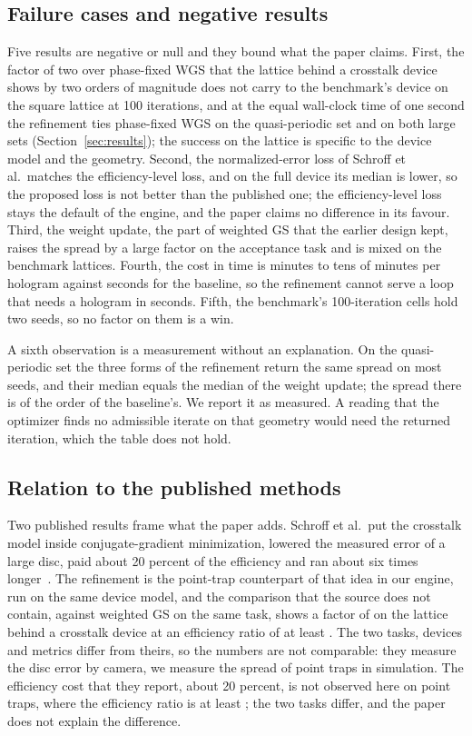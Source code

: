 \subsection{Failure cases and negative results}

Five results are negative or null and they bound what the paper claims. First, the factor of two over phase-fixed WGS that the lattice behind a crosstalk device shows by two orders of magnitude does not carry to the benchmark's device on the square lattice at 100 iterations, and at the equal wall-clock time of one second the refinement ties phase-fixed WGS on the quasi-periodic set and on both large sets (Section~\ref{sec:results}); the success on the lattice is specific to the device model and the geometry. Second, the normalized-error loss of Schroff et al.\ matches the efficiency-level loss, and on the full device its median is lower, so the proposed loss is not better than the published one; the efficiency-level loss stays the default of the engine, and the paper claims no difference in its favour. Third, the weight update, the part of weighted GS that the earlier design kept, raises the spread by a large factor on the acceptance task and is mixed on the benchmark lattices. Fourth, the cost in time is minutes to tens of minutes per hologram against seconds for the baseline, so the refinement cannot serve a loop that needs a hologram in seconds. Fifth, the benchmark's 100-iteration cells hold two seeds, so no factor on them is a win.

A sixth observation is a measurement without an explanation. On the quasi-periodic set the three forms of the refinement return the same spread on most seeds, and their median equals the median of the weight update; the spread there is of the order of the baseline's. We report it as measured. A reading that the optimizer finds no admissible iterate on that geometry would need the returned iteration, which the table does not hold.

\subsection{Relation to the published methods}

Two published results frame what the paper adds. Schroff et al.\ put the crosstalk model inside conjugate-gradient minimization, lowered the measured error of a large disc, paid about 20 percent of the efficiency and ran about six times longer~\cite{schroff}. The refinement is the point-trap counterpart of that idea in our engine, run on the same device model, and the comparison that the source does not contain, against weighted GS on the same task, shows a factor of \ratioOneGm{} on the lattice behind a crosstalk device at an efficiency ratio of at least \effRatioOneMin{}. The two tasks, devices and metrics differ from theirs, so the numbers are not comparable: they measure the disc error by camera, we measure the spread of point traps in simulation. The efficiency cost that they report, about 20 percent, is not observed here on point traps, where the efficiency ratio is at least \effRatioOneMin{}; the two tasks differ, and the paper does not explain the difference.

